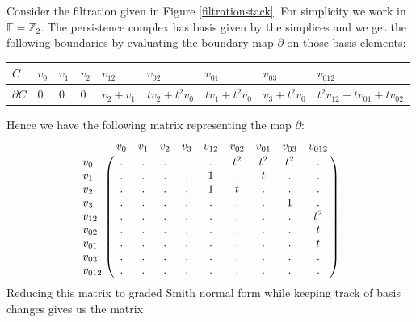 \begin{example}\label{bddreduce}
  Consider the filtration given in Figure \ref{filtrationstack}. For simplicity we work in $\mathbb{F}=\mathbb{Z}_{2}$. The persistence complex has basis given by the simplices and we get the following boundaries by evaluating the boundary map $\partial$ on those basis elements:
\begin{center}
\begin{tabular}{l | *8l}
  $C$ & $v_{0}$ & $v_{1}$ & $v_{2}$ & $v_{12}$ & $v_{02}$ & $v_{01}$ & $v_{03}$ & $v_{012}$ \\ \midrule
  $\partial C$ & $0$ & $0$ & $0$ & $v_2 + v_{1}$ & $tv_{2}+t^2v_{0}$ & $tv_{1}+t^{2}v_{0}$ & $v_3+t^{2}v_{0}$ & $t^{2}v_{12}+tv_{01}+tv_{02}$
\end{tabular}
\end{center}


Hence we have the following matrix representing the map $\partial$:
\[
  \bordermatrix{
    & v_{0} & v_{1} & v_{2} & v_{3} & v_{12} & v_{02} & v_{01} & v_{03} & v_{012}\cr
    v_{0}  &.&.&.&.&.&t^{2}&t^{2}&t^{2}&.\cr
    v_{1}  &.&.&.&.&1&.&t&.&.\cr
    v_{2}  &.&.&.&.&1&t&.&.&.\cr
    v_{3}  &.&.&.&.&.&.&.&1&.\cr
    v_{12} &.&.&.&.&.&.&.&.&t^{2}\cr
    v_{02} &.&.&.&.&.&.&.&.&t\cr
    v_{01} &.&.&.&.&.&.&.&.&t\cr
    v_{03} &.&.&.&.&.&.&.&.&.\cr
    v_{012}&.&.&.&.&.&.&.&.&.
    }
  \]
  Reducing this matrix to graded Smith normal form while keeping track of basis changes gives us the matrix



\end{example}
